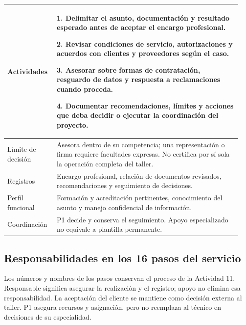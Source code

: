 {\begin{minipage}{\linewidth}
{\begin{tabular}{@{}p{0.20\linewidth}p{0.75\linewidth}@{}}
Actividades & 1. Delimitar el asunto, documentación y resultado esperado antes de aceptar el encargo profesional.\par 2. Revisar condiciones de servicio, autorizaciones y acuerdos con clientes y proveedores según el caso.\par 3. Asesorar sobre formas de contratación, resguardo de datos y respuesta a reclamaciones cuando proceda.\par 4. Documentar recomendaciones, límites y acciones que deba decidir o ejecutar la coordinación del proyecto. \\ \midrule
Límite de decisión & Asesora dentro de su competencia; una representación o firma requiere facultades expresas. No certifica por sí sola la operación completa del taller. \\ \midrule
Registros & Encargo profesional, relación de documentos revisados, recomendaciones y seguimiento de decisiones. \\ \midrule
Perfil funcional & Formación y acreditación pertinentes, conocimiento del asunto y manejo confidencial de información. \\ \midrule
Coordinación & P1 decide y conserva el seguimiento. Apoyo especializado no equivale a plantilla permanente. \\ \midrule
\end{tabular}}\end{minipage}\par\medskip
\clearpage\subsection{Responsabilidades en los 16 pasos del servicio}
Los números y nombres de los pasos conservan el proceso de la Actividad 11. Responsable significa asegurar la realización y el registro; apoyo no elimina esa responsabilidad. La aceptación del cliente se mantiene como decisión externa al taller. P1 asegura recursos y asignación, pero no reemplaza al técnico en decisiones de su especialidad.


}
